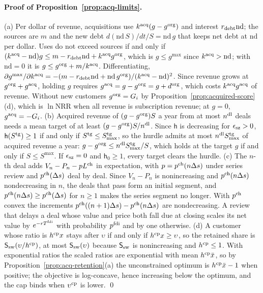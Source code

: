 \paragraph{Proof of Proposition~\ref{prop:acq-limits}.}
(a) Per dollar of revenue, acquisitions use $k^{\rm acq}(g-g^{\rm org})$ and interest $r_{\rm debt}\mathrm{nd}$; the sources are $m$ and the new debt $d(\mathrm{nd}\,S)/dt/S=\mathrm{nd}\,g$ that keeps net debt at $\mathrm{nd}$ per dollar. Uses do not exceed sources if and only if $(k^{\rm acq}-\mathrm{nd})g\le m-r_{\rm debt}\mathrm{nd}+k^{\rm acq}g^{\rm org}$, which is $g\le g^{\max}$ since $k^{\rm acq}>\mathrm{nd}$; with $\mathrm{nd}=0$ it is $g\le g^{\rm org}+m/k^{\rm acq}$. Differentiating, $\partial g^{\max}/\partial k^{\rm acq}=-(m-r_{\rm debt}\mathrm{nd}+\mathrm{nd}\,g^{\rm org})/(k^{\rm acq}-\mathrm{nd})^2$. Since revenue grows at $g^{\rm org}+g^{\rm acq}$, holding $g$ requires $g^{\rm acq}=g-g^{\rm org}=g+d^{\rm org}$, which costs $k^{\rm acq}g^{\rm acq}$ of revenue. Without new customers $g^{\rm org}=G_i$ by Proposition~\ref{prop:acquired-score}(d), which is $\ln\mathrm{NRR}$ when all revenue is subscription revenue; at $g=0$, $g^{\rm acq}=-G_i$.
(b) Acquired revenue of $(g-g^{\rm org})S$ a year from at most $n^{\rm dl}$ deals needs a mean target of at least $(g-g^{\rm org})S/n^{\rm dl}$. Since $\mathsf h$ is decreasing for $\epsilon_{\rm sz}>0$, $\mathsf h(S^{\rm tg})\ge1$ if and only if $S^{\rm tg}\le S^{\rm tg}_{\max}$, so the hurdle admits at most $n^{\rm dl}S^{\rm tg}_{\max}$ of acquired revenue a year: $g-g^{\rm org}\le n^{\rm dl}S^{\rm tg}_{\max}/S$, which holds at the target $g$ if and only if $S\le S^{\max}$. If $\epsilon_{\rm sz}=0$ and $\mathsf h_0\ge1$, every target clears the hurdle.
(c) The $n$-th deal adds $V_n-P_n-p L^{\rm ch}$ in expectation, with $p=p^{\rm ch}(n\Delta s)$ under series review and $p^{\rm ch}(\Delta s)$ deal by deal. Since $V_n-P_n$ is nonincreasing and $p^{\rm ch}(n\Delta s)$ nondecreasing in $n$, the deals that pass form an initial segment, and $p^{\rm ch}(n\Delta s)\ge p^{\rm ch}(\Delta s)$ for $n\ge1$ makes the series segment no longer. With $p^{\rm ch}$ convex the increments $p^{\rm ch}((n+1)\Delta s)-p^{\rm ch}(n\Delta s)$ are nondecreasing. A review that delays a deal whose value and price both fall due at closing scales its net value by $e^{-rT^{\rm fdi}}$ with probability $p^{\rm fdi}$ and by one otherwise.
(d) A customer whose ratio is $h^{\rm cp}x$ stays after $\upsilon$ if and only if $h^{\rm cp}x\ge\upsilon$, so the retained share is $\mathsf S_{\rm sw}(\upsilon/h^{\rm cp})$, at most $\mathsf S_{\rm sw}(\upsilon)$ because $\mathsf S_{\rm sw}$ is nonincreasing and $h^{\rm cp}\le1$. With exponential ratios the scaled ratios are exponential with mean $h^{\rm cp}\bar x$, so by Proposition~\ref{prop:acq-retention}(a) the unconstrained optimum is $h^{\rm cp}\bar x-1$ when positive; the objective is log-concave, hence increasing below the optimum, and the cap binds when $\upsilon^{\rm cp}$ is lower. \qed
